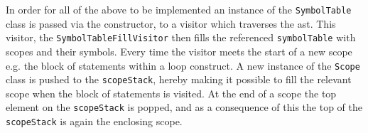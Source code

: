 In order for all of the above to be implemented an instance of the \texttt{SymbolTable} class is passed via the constructor, to a visitor which traverses the \acrshort{ast}.
This visitor, the \texttt{SymbolTableFillVisitor} then fills the referenced \texttt{symbolTable} with scopes and their symbols.
Every time the visitor meets the start of a new scope e.g. the block of statements within a loop construct.
A new instance of the \texttt{Scope} class is pushed to the \texttt{scopeStack}, hereby making it possible to fill the relevant scope when the block of statements is visited.
At the end of a scope the top element on the \texttt{scopeStack} is popped, and as a consequence of this the top of the \texttt{scopeStack} is again the enclosing scope.
